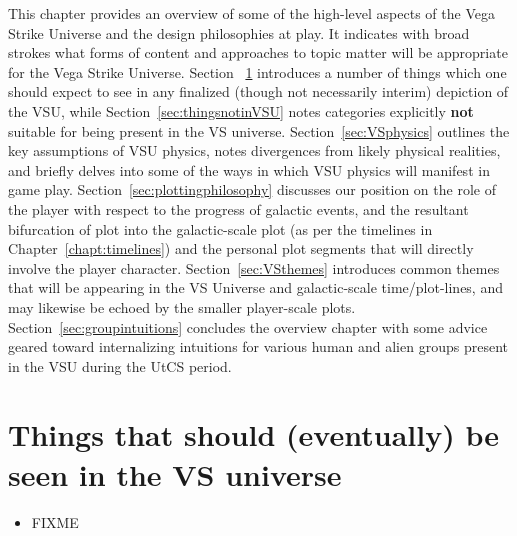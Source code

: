 \label{chapt:overview}
This chapter provides an overview of some of the high-level aspects of
the Vega Strike Universe and the design philosophies at play. It
indicates with broad strokes what forms of content and approaches to
topic matter will be appropriate for the Vega Strike Universe. Section
~\ref{sec:thingsseeninVSU} introduces a number of things which one
should expect to see in any finalized (though not necessarily interim)
depiction of the VSU, while Section~\ref{sec:thingsnotinVSU} notes
categories explicitly {\bf not} suitable for being present in the VS
universe. Section~\ref{sec:VSphysics} outlines the key assumptions of
VSU physics, notes divergences from likely physical realities, and
briefly delves into some of the ways in which VSU physics will
manifest in game play. Section~\ref{sec:plottingphilosophy} discusses
our position on the role of the player with respect to the progress of
galactic events, and the resultant bifurcation of plot into the
galactic-scale plot (as per the timelines in
Chapter~\ref{chapt:timelines}) and the personal plot segments that
will directly involve the player character. Section~\ref{sec:VSthemes}
introduces common themes that will be appearing in the VS Universe and
galactic-scale time/plot-lines, and may likewise be echoed by the
smaller player-scale plots. Section~\ref{sec:groupintuitions}
concludes the overview chapter with some advice geared toward
internalizing intuitions for various human and alien groups present in
the VSU during the UtCS period.

\section{Things that should (eventually) be seen in the VS universe}
\label{sec:thingsseeninVSU}
\begin{itemize}
\item FIXME
\end{itemize}

